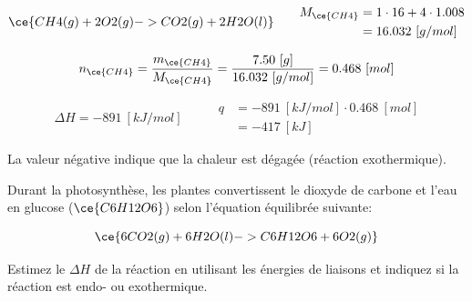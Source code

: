 \documentclass[
  11pt,
  a4paper,
  openany]{book}
\begin{document}
\begin{Answer}
\[
\begin{split}
\ce{CH4(g) + 2 O2(g) -> CO2(g) + 2 H2O(l)}
\end{split}
\qquad
\begin{split}
M_{\ce{CH4}} &= 1 \cdot 16 + 4 \cdot 1.008 \\
&= 16.032\ [g/mol]
\end{split}
\]

\[
n_{\ce{CH4}} = \frac{m_{\ce{CH4}}}{M_{\ce{CH4}}} = \frac{7.50\ [g]}{16.032\ [g/mol]} = 0.468\ [mol]
\]

\[
\begin{split}
\Delta H = -891\ [kJ/mol]
\end{split}
\qquad
\begin{split}
q &= -891\ [kJ/mol] \cdot 0.468\ [mol] \\
&= -417\ [kJ]
\end{split}
\]

La valeur négative indique que la chaleur est dégagée (réaction exothermique).

\end{Answer}

\begin{Exercise}

Durant la photosynthèse, les plantes convertissent le dioxyde de carbone et l'eau en glucose (\(\ce{C6H12O6}\)) selon l'équation équilibrée suivante:

\[
\ce{6 CO2(g) + 6 H2O(l) -> C6H12O6 + 6 O2(g)}
\]

Estimez le \(\Delta H\) de la réaction en utilisant les énergies de liaisons et indiquez si la réaction est endo- ou exothermique.


\end{Exercise}
\end{document}
